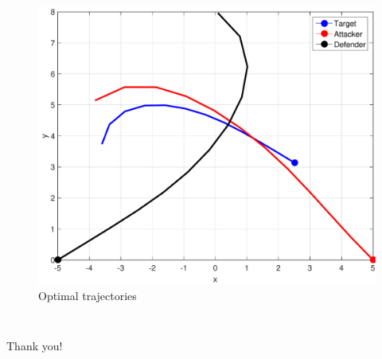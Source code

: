 \documentclass{beamer}
\begin{document}
\begin{frame}
\begin{columns}[c]
	\begin{column}{.3\linewidth}
		\begin{figure}[H]
			\centering
			\includegraphics[scale = 0.2]{fig/fig8_paper_numerical.pdf}
			\caption{Optimal trajectories}
			\label{Optimal trajectories}
		\end{figure}
	\end{column}

\end{columns}

\end{frame}
\subsection{} 
\begin{frame}
\Huge{\centerline{Thank you!}}
\end{frame}

\end{document}
